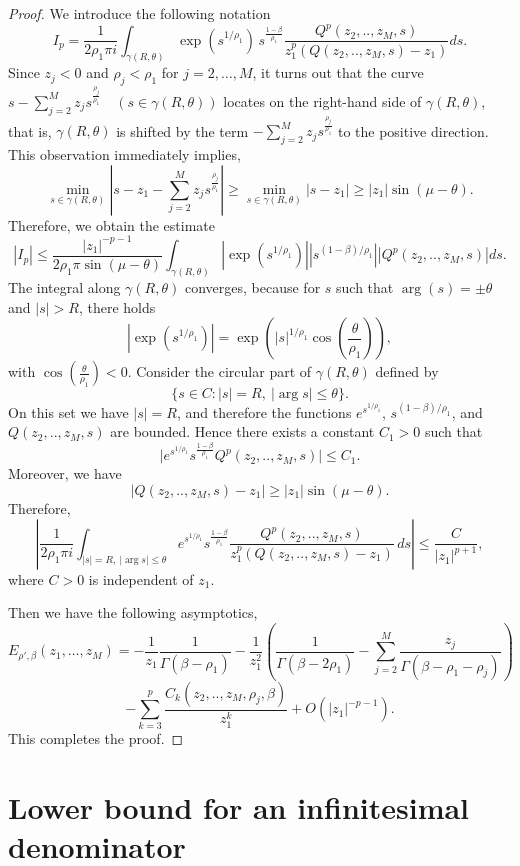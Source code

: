 \documentclass[12pt, reqno]{amsart}
\theoremstyle{definition}
\theoremstyle{remark}
\numberwithin{equation}{section}
\begin{document}
\begin{proof}
We introduce the following notation
$$
I_p=\frac{1}{2\rho_1 \pi i}
\int_{\gamma(R,\theta)}
\exp\!\left(s^{1/\rho_1}\right)
\, s^{\frac{1-\beta}{\rho_1}}\frac{Q^p (z_2,..,z_M,s)}{z_1^p(Q(z_2,..,z_M,s)-z_1)}ds.$$
Since \( z_j < 0 \) and \( \rho_j < \rho_1 \) for \( j = 2, \ldots, M \), it turns out that the curve 
$
s - \sum_{j=2}^M z_j s^{\frac{\rho_j}{\rho_1}} \quad (s \in \gamma(R, \theta))
$
locates on the right-hand side of \( \gamma(R, \theta) \),
that is, \( \gamma(R, \theta) \) is shifted by the term 
$
- \sum_{j=2}^M z_j s^{\frac{\rho_j}{\rho_1}} 
$ to the positive direction.
This observation immediately implies,
\[
\min_{s \in \gamma(R, \theta)} \left| s - z_1 - \sum_{j=2}^M z_j s^{\frac{\rho_j}{\rho_1}} \right| \geq \min_{s \in \gamma(R, \theta)} |s- z_1| \geq |z_1| \sin(\mu - \theta).
\]
Therefore, we obtain the estimate
\[
|I_p| \leq \frac{|z_1|^{-p-1}}{2\rho_1\pi \sin\left(\mu - \theta\right)}  \int_{\gamma(R,\theta)} \left| \exp\left(s^{1/\rho_1}\right) \right| \left| s^{(1-\beta)/\rho_1} \right| \left|Q^p (z_2,..,z_M,s)\right|ds.
\]
The integral along $\gamma(R, \theta)$ converges, because for $s$ such that $\arg(s) = \pm \theta$ and $|s| > R$, there holds
\[
\left| \exp\left( s^{1/\rho_1} \right) \right| = \exp\left( |s|^{1/\rho_1} \cos\left( \frac{\theta}{\rho_1} \right) \right),
\]
with $\cos\left( \frac{\theta}{\rho_1} \right) < 0$.
Consider the circular part of $\gamma(R,\theta)$ defined by
\[
\{ s\in{C} : |s|=R,\ |\arg s|\le\theta \}.
\]
On this set we have $|s|=R$, and therefore the functions
$e^{s^{1/\rho_1}}$, $s^{(1-\beta)/\rho_1}$, and $Q(z_2,..,z_M,s)$  are bounded.
Hence there exists a constant $C_1>0$ such that
\[
\big| e^{s^{1/\rho_1}} s^{\frac{1-\beta}{\rho_1}} Q^p(z_2,..,z_M,s) \big|
\le C_1.
\]
Moreover, we have
\[
|Q(z_2,..,z_M,s)-z_1|\ge |z_1| \sin(\mu - \theta).
\]
Therefore,
\[
\left|
\frac{1}{2\rho_1\pi i}
\int_{|s|=R,\ |\arg s|\le\theta}
e^{s^{1/\rho_1}}
s^{\frac{1-\beta}{\rho_1}}
\frac{Q^p(z_2,..,z_M,s)}{z_1^p (Q(z_2,..,z_M,s)-z_1)}
\,ds
\right|
\le
\frac{C}{|z_1|^{p+1}},
\]
where $C>0$ is independent of $z_1$.


 Then we have the following asymptotics,
$$
E_{{\rho}',\beta}(z_1, \ldots, z_M)=-\frac{1}{z_1}\frac{1}{\Gamma(\beta-\rho_1)}-\frac{1}{z_1^2}\left(\frac{1}{\Gamma(\beta-2\rho_1)}
-
\sum_{j=2}^{M}
\frac{z_j}{\Gamma(\beta-\rho_1-\rho_j)}\right)$$
$$
-\sum_{k=3}^p \frac{C_k(z_2,..,z_M,\rho_j,\beta)}{z_1^k}+O\left(|z_1|^{-p-1}\right).
$$
This completes the proof. \end{proof}


\section{Lower bound for an infinitesimal denominator}
\label{sec:4}
\end{document}
